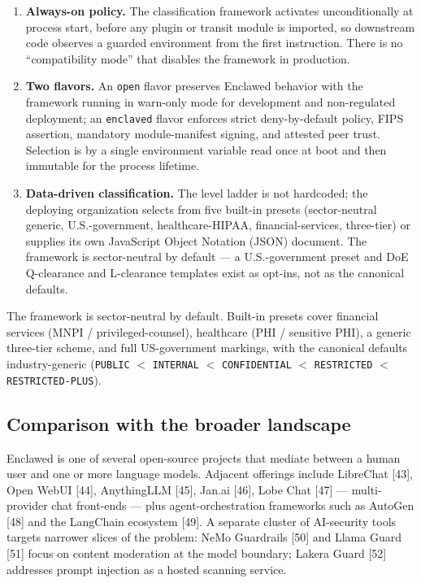\documentclass[11pt]{article}
\begin{document}
\begin{enumerate}
  \item \textbf{Always-on policy.} The classification framework
    activates unconditionally at process start, before any plugin or
    transit module is imported, so downstream code observes a guarded
    environment from the first instruction. There is no
    ``compatibility mode'' that disables the framework in production.
  \item \textbf{Two flavors.} An \texttt{open} flavor preserves
    Enclawed behavior with the framework running in warn-only mode for
    development and non-regulated deployment; an \texttt{enclaved}
    flavor enforces strict deny-by-default policy, FIPS assertion,
    mandatory module-manifest signing, and attested peer trust.
    Selection is by a single environment variable read once at boot
    and then immutable for the process lifetime.
  \item \textbf{Data-driven classification.} The level ladder is not
    hardcoded; the deploying organization selects from five built-in
    presets (sector-neutral generic, U.S.-government, healthcare-HIPAA,
    financial-services, three-tier) or supplies its own JavaScript
    Object Notation (JSON) document. The framework is sector-neutral by
    default --- a U.S.-government preset and DoE Q-clearance and
    L-clearance templates exist as opt-ins, not as the canonical
    defaults.
\end{enumerate}

The framework is sector-neutral by default. Built-in presets cover
financial services (MNPI / privileged-counsel), healthcare (PHI /
sensitive PHI), a generic three-tier scheme, and full US-government
markings, with the canonical defaults industry-generic (\texttt{PUBLIC}
$<$ \texttt{INTERNAL} $<$ \texttt{CONFIDENTIAL} $<$ \texttt{RESTRICTED}
$<$ \texttt{RESTRICTED-PLUS}).

\subsection{Comparison with the broader landscape}
\label{sec:landscape}

Enclawed is one of several open-source projects that mediate between a
human user and one or more language models. Adjacent offerings
include LibreChat [43], Open WebUI [44], AnythingLLM [45], Jan.ai
[46], Lobe Chat [47] --- multi-provider chat front-ends --- plus
agent-orchestration frameworks such as AutoGen [48] and the LangChain
ecosystem [49]. A separate cluster of AI-security tools targets
narrower slices of the problem: NeMo Guardrails [50] and Llama Guard
[51] focus on content moderation at the model boundary; Lakera Guard
[52] addresses prompt injection as a hosted scanning service.
\end{document}
